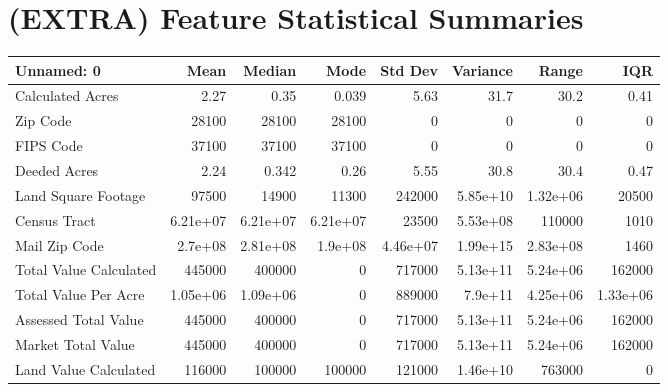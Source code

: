 \section{(EXTRA) Feature Statistical Summaries}

\begin{tabular}{lrrrrrrr}
\hline
 Unnamed: 0                     &          Mean &        Median &          Mode &       Std Dev &      Variance &         Range &           IQR \\
\hline
 Calculated Acres               &      2.27     &      0.35     &      0.039    &      5.63     &     31.7      &     30.2      &      0.41     \\
 Zip Code                       &  28100        &  28100        &  28100        &      0        &      0        &      0        &      0        \\
 FIPS Code                      &  37100        &  37100        &  37100        &      0        &      0        &      0        &      0        \\
 Deeded Acres                   &      2.24     &      0.342    &      0.26     &      5.55     &     30.8      &     30.4      &      0.47     \\
 Land Square Footage            &  97500        &  14900        &  11300        & 242000        &      5.85e+10 &      1.32e+06 &  20500        \\
 Census Tract                   &      6.21e+07 &      6.21e+07 &      6.21e+07 &  23500        &      5.53e+08 & 110000        &   1010        \\
 Mail Zip Code                  &      2.7e+08  &      2.81e+08 &      1.9e+08  &      4.46e+07 &      1.99e+15 &      2.83e+08 &   1460        \\
 Total Value Calculated         & 445000        & 400000        &      0        & 717000        &      5.13e+11 &      5.24e+06 & 162000        \\
 Total Value Per Acre           &      1.05e+06 &      1.09e+06 &      0        & 889000        &      7.9e+11  &      4.25e+06 &      1.33e+06 \\
 Assessed Total Value           & 445000        & 400000        &      0        & 717000        &      5.13e+11 &      5.24e+06 & 162000        \\
 Market Total Value             & 445000        & 400000        &      0        & 717000        &      5.13e+11 &      5.24e+06 & 162000        \\
 Land Value Calculated          & 116000        & 100000        & 100000        & 121000        &      1.46e+10 & 763000        &      0        \\

\end{tabular}
